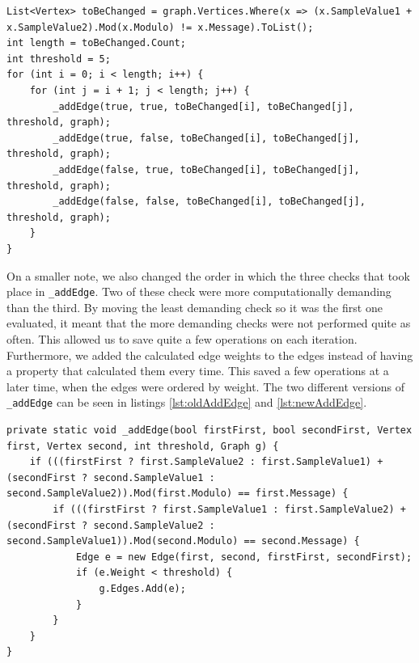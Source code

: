 \begin{lstlisting}[firstnumber=449,label=lst:newEdgeAdding, caption={Improved algorithm for adding edges to the graph. From second round JPEGImage.cs.}]
List<Vertex> toBeChanged = graph.Vertices.Where(x => (x.SampleValue1 + x.SampleValue2).Mod(x.Modulo) != x.Message).ToList();
int length = toBeChanged.Count;
int threshold = 5;
for (int i = 0; i < length; i++) {
    for (int j = i + 1; j < length; j++) {
        _addEdge(true, true, toBeChanged[i], toBeChanged[j], threshold, graph);
        _addEdge(true, false, toBeChanged[i], toBeChanged[j], threshold, graph);
        _addEdge(false, true, toBeChanged[i], toBeChanged[j], threshold, graph);
        _addEdge(false, false, toBeChanged[i], toBeChanged[j], threshold, graph);
    }
}
\end{lstlisting}

On a smaller note, we also changed the order in which the three checks that took place in \lstinline|_addEdge|.
Two of these check were more computationally demanding than the third.
By moving the least demanding check so it was the first one evaluated, it meant that the more demanding checks were not performed quite as often.
This allowed us to save quite a few operations on each iteration.
Furthermore, we added the calculated edge weights to the edges instead of having a property that calculated them every time.
This saved a few operations at a later time, when the edges were ordered by weight.
The two different versions of \lstinline|_addEdge| can be seen in listings \ref{lst:oldAddEdge} and \ref{lst:newAddEdge}.

\begin{lstlisting}[firstnumber=478,label=lst:oldAddEdge, caption={The original \lstinline|_addEdge| method. From first round JPEGImage.cs.}]
private static void _addEdge(bool firstFirst, bool secondFirst, Vertex first, Vertex second, int threshold, Graph g) {
    if (((firstFirst ? first.SampleValue2 : first.SampleValue1) + (secondFirst ? second.SampleValue1 : second.SampleValue2)).Mod(first.Modulo) == first.Message) {
        if (((firstFirst ? first.SampleValue1 : first.SampleValue2) + (secondFirst ? second.SampleValue2 : second.SampleValue1)).Mod(second.Modulo) == second.Message) {
            Edge e = new Edge(first, second, firstFirst, secondFirst);
            if (e.Weight < threshold) {
                g.Edges.Add(e);
            }
        }
    }
}
\end{lstlisting}

